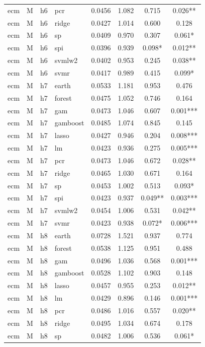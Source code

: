 \begin{ThreePartTable}
\begin{longtable}[t]{llclcccc}
ecm & M & h6 & pcr & 0.0456 & 1.082 & 0.715 & 0.026**\\
ecm & M & h6 & ridge & 0.0427 & 1.014 & 0.600 & 0.128\\
ecm & M & h6 & sp & 0.0409 & 0.970 & 0.307 & 0.061*\\
ecm & M & h6 & spi & 0.0396 & 0.939 & 0.098* & 0.012**\\
ecm & M & h6 & svmlw2 & 0.0402 & 0.953 & 0.245 & 0.038**\\
ecm & M & h6 & svmr & 0.0417 & 0.989 & 0.415 & 0.099*\\
\addlinespace
ecm & M & h7 & earth & 0.0533 & 1.181 & 0.953 & 0.476\\
ecm & M & h7 & forest & 0.0475 & 1.052 & 0.746 & 0.164\\
ecm & M & h7 & gam & 0.0473 & 1.046 & 0.607 & 0.001***\\
ecm & M & h7 & gamboost & 0.0485 & 1.074 & 0.845 & 0.145\\
ecm & M & h7 & lasso & 0.0427 & 0.946 & 0.204 & 0.008***\\
ecm & M & h7 & lm & 0.0423 & 0.936 & 0.275 & 0.005***\\
ecm & M & h7 & pcr & 0.0473 & 1.046 & 0.672 & 0.028**\\
ecm & M & h7 & ridge & 0.0465 & 1.030 & 0.671 & 0.164\\
ecm & M & h7 & sp & 0.0453 & 1.002 & 0.513 & 0.093*\\
ecm & M & h7 & spi & 0.0423 & 0.937 & 0.049** & 0.003***\\
ecm & M & h7 & svmlw2 & 0.0454 & 1.006 & 0.531 & 0.042**\\
ecm & M & h7 & svmr & 0.0423 & 0.938 & 0.072* & 0.006***\\
\addlinespace
ecm & M & h8 & earth & 0.0728 & 1.521 & 0.937 & 0.774\\
ecm & M & h8 & forest & 0.0538 & 1.125 & 0.951 & 0.488\\
ecm & M & h8 & gam & 0.0496 & 1.036 & 0.568 & 0.001***\\
ecm & M & h8 & gamboost & 0.0528 & 1.102 & 0.903 & 0.148\\
ecm & M & h8 & lasso & 0.0457 & 0.955 & 0.253 & 0.012**\\
ecm & M & h8 & lm & 0.0429 & 0.896 & 0.146 & 0.001***\\
ecm & M & h8 & pcr & 0.0486 & 1.016 & 0.557 & 0.020**\\
ecm & M & h8 & ridge & 0.0495 & 1.034 & 0.674 & 0.178\\
ecm & M & h8 & sp & 0.0482 & 1.006 & 0.536 & 0.061*\\

\end{longtable}
\end{ThreePartTable}
